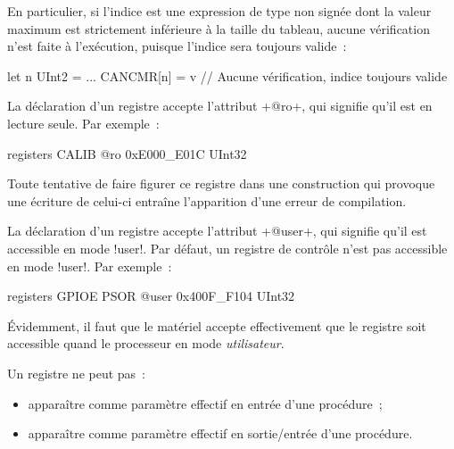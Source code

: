 En particulier, si l'indice est une expression de type non signée dont la valeur maximum est strictement inférieure à la taille du tableau, aucune vérification n'est faite à l'exécution, puisque l'indice sera toujours valide~: 

\begin{PLM}
let n UInt2 = ...
CANCMR[n] = v // Aucune vérification, indice toujours valide
\end{PLM}









La déclaration d'un registre accepte l'attribut \plm+@ro+, qui signifie qu'il est en lecture seule. Par exemple~:
\begin{PLM}
registers {
   CALIB @ro 0xE000_E01C UInt32
}
\end{PLM}

Toute tentative de faire figurer ce registre dans une construction qui provoque une écriture de celui-ci entraîne l'apparition d'une erreur de compilation.






La déclaration d'un registre accepte l'attribut \plm+@user+, qui signifie qu'il est accessible en mode \plm!user!. Par défaut, un registre de contrôle n'est pas accessible en mode  \plm!user!. Par exemple~:
\begin{PLM}
registers GPIOE {
  PSOR @user 0x400F_F104 UInt32
}
\end{PLM}

Évidemment, il faut que le matériel accepte effectivement que le registre soit accessible quand le processeur en mode \emph{utilisateur}.










Un registre ne peut pas~:
\begin{itemize}
  \item apparaître comme paramètre effectif en entrée d'une procédure~;
  \item apparaître comme paramètre effectif en sortie/entrée d'une procédure.
\end{itemize}

